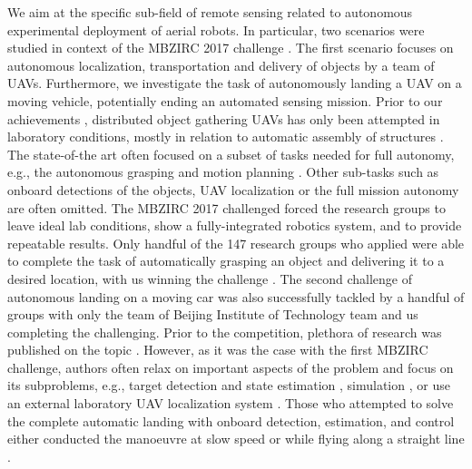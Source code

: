\documentclass[a4paper,11pt,titlepage,twoside]{book}
\begin{document}
We aim at the specific sub-field of remote sensing related to autonomous experimental deployment of aerial robots.
In particular, two scenarios were studied in context of the \ac{MBZIRC} 2017 challenge \cite{dias2019journal}.
The first scenario focuses on autonomous localization, transportation and delivery of objects by a team of \acp{UAV}.
Furthermore, we investigate the task of autonomously landing a \ac{UAV} on a moving vehicle, potentially ending an automated sensing mission.
Prior to our achievements \cite{loianno2018localization, spurny2019cooperative}, distributed object gathering \acp{UAV} has only been attempted in laboratory conditions, mostly in relation to automatic assembly of structures \cite{mirjan2016building, alejo2014collisionfree, augugliaro2014flight, lindsey2013distributed}.
The state-of-the art often focused on a subset of tasks needed for full autonomy, e.g., the autonomous grasping \cite{gawel2017aerial, thomas2014toward} and motion planning \cite{alejo2014collisionfree}.
Other sub-tasks such as onboard detections of the objects, \ac{UAV} localization or the full mission autonomy are often omitted.
The \ac{MBZIRC} 2017 challenged forced the research groups to leave ideal lab conditions, show a fully-integrated robotics system, and to provide repeatable results.
Only handful of the 147 research groups who applied \cite{beul2019team, bahnemann2019eth, lee2019mission, castano2019robotics} were able to complete the task of automatically grasping an object and delivering it to a desired location, with us winning the challenge \cite{spurny2019cooperative}.
The second challenge of autonomous landing on a moving car was also successfully tackled by a handful of groups \cite{beul2017fast,  li2019fast, battiato2017system, cantelli2017autonomous, jin2019ellipse} with only the team of Beijing Institute of Technology team \cite{jin2019ellipse} and us \cite{baca2019autonomous} completing the challenging.
Prior to the competition, plethora of research was published on the topic \cite{jin2016onboard}.
However, as it was the case with the first \ac{MBZIRC} challenge, authors often relax on important aspects of the problem and focus on its subproblems, e.g., target detection and state estimation \cite{benini2016real, lin2017monocular}, simulation \cite{jung2015close, jung2016target, ghommam2017autonomous}, or use an external laboratory \ac{UAV} localization system \cite{ghamry2016real, lee2012autonomous, hui2013autonomous}.
Those who attempted to solve the complete automatic landing with onboard detection, estimation, and control either conducted the manoeuvre at slow speed \cite{hoang2017vision} or while flying along a straight line \cite{borowczyk2017autonomous}.
\end{document}
